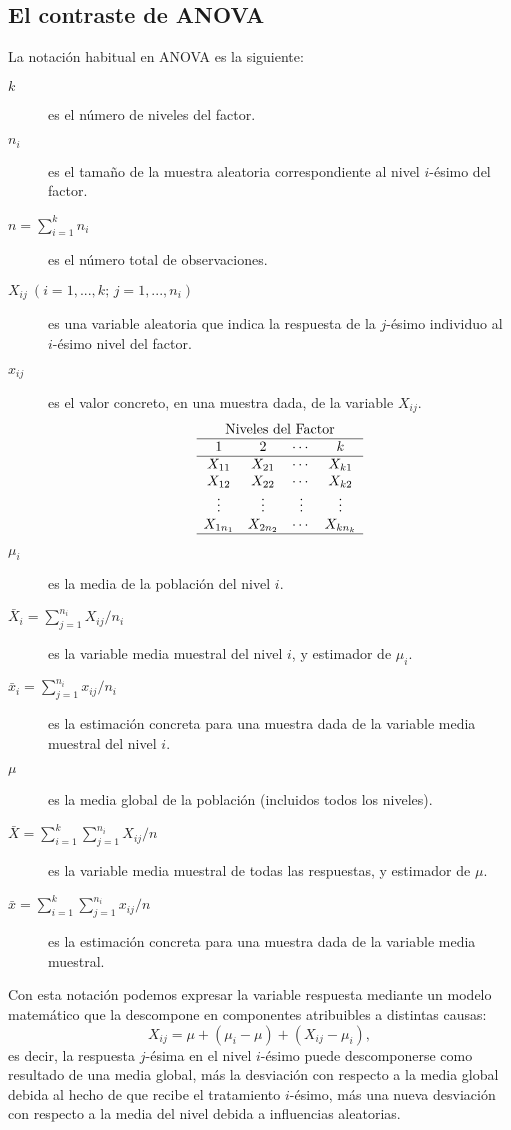 \subsection{El contraste de ANOVA}
La notación habitual en ANOVA es la siguiente:
\begin{description}
\item[$k$] es el número de niveles del factor.
\item[$n_i$] es el tamaño de la muestra aleatoria correspondiente al nivel $i$-ésimo del factor.
\item[$n = \sum_{i = 1}^k {n_i}$] es el número total de observaciones.
\item[$X_{ij}\ (i = 1,...,k;\,j = 1,...,n_i)$] es una variable aleatoria que indica la respuesta de la $j$-ésimo individuo al $i$-ésimo nivel del factor.
\item [$x_{ij}$] es el valor concreto, en una muestra dada, de la variable $X_{ij}$.
\[
\begin{array}{cccc}
\multicolumn{4}{c}{\textrm{Niveles del Factor}} \\
\hline
1 & 2 & \cdots & k\\
\hline
X_{11} & X_{21} & \cdots & X_{k1}\\
X_{12} & X_{22} & \cdots & X_{k2}\\
\vdots & \vdots & \vdots & \vdots\\
X_{1n_1} & X_{2n_2} & \cdots & X_{kn_k}\\
\hline
\end{array}
\]
\item[$\mu_i$] es la media de la población del nivel $i$.
\item [$\bar X_i = \sum_{j = 1}^{n_i} X_{ij}/n_i$] es la variable media muestral del nivel $i$, y estimador de $\mu_i$.
\item [$\bar x_i = \sum_{j = 1}^{n_i} x_{ij}/n_i$] es la estimación concreta para una muestra dada de la variable media muestral del nivel $i$.
\item [$\mu$] es la media global de la población (incluidos todos los niveles).
\item [$\bar X  = \sum_{i = 1}^k \sum_{j = 1}^{n_i } X_{ij}/n$] es la variable media muestral de todas las respuestas, y estimador de $\mu$.
\item [$\bar x  = \sum_{i = 1}^k \sum_{j = 1}^{n_i }x_{ij}/n$] es la estimación concreta para una muestra dada de la variable media muestral.
\end{description}

Con esta notación podemos expresar la variable respuesta mediante un modelo matemático que la descompone en componentes atribuibles a distintas causas:
\[
X_{ij} = \mu+(\mu_i-\mu) + (X_{ij}-\mu_i),
\]
es decir, la respuesta $j$-ésima en el nivel $i$-ésimo puede descomponerse como resultado de una media global, más la desviación con respecto a la media global debida al hecho de que recibe el tratamiento $i$-ésimo, más una nueva desviación con respecto a la media del nivel debida a influencias aleatorias.

